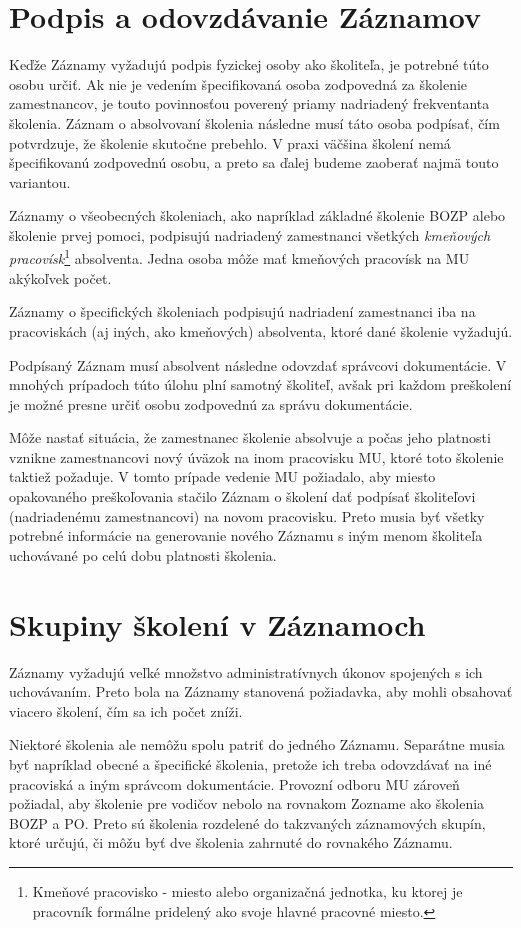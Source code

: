 \documentclass[
  digital,     %
  oneside,     %
  nosansbold,  %
  nocolorbold, %
  lof,         %
  nolot,         %
]{fithesis4}
\begin{document}
\section{Podpis a odovzdávanie Záznamov}
Keďže Záznamy vyžadujú podpis fyzickej osoby ako školiteľa, je potrebné túto osobu určiť. Ak nie je vedením špecifikovaná osoba zodpovedná za školenie zamestnancov, je touto povinnosťou poverený priamy nadriadený frekventanta školenia. Záznam o absolvovaní školenia následne musí táto osoba podpísať, čím potvrdzuje, že školenie skutočne prebehlo. V praxi väčšina školení nemá špecifikovanú zodpovednú osobu, a preto sa ďalej budeme zaoberať najmä touto variantou.

Záznamy o všeobecných školeniach, ako napríklad základné školenie BOZP alebo školenie prvej pomoci, podpisujú nadriadený zamestnanci všetkých \textit{kmeňových pracovísk}\footnote{Kmeňové pracovisko - miesto alebo organizačná jednotka, ku ktorej je pracovník formálne pridelený ako svoje hlavné pracovné miesto.} absolventa. Jedna osoba môže mať kmeňových pracovísk na MU akýkoľvek počet.

Záznamy o špecifických školeniach podpisujú nadriadení zamestnanci iba na pracoviskách (aj iných, ako kmeňových) absolventa, ktoré dané školenie vyžadujú.

Podpísaný Záznam musí absolvent následne odovzdať správcovi dokumentácie. V mnohých prípadoch túto úlohu plní samotný školiteľ, avšak pri každom preškolení je možné presne určiť osobu zodpovednú za správu dokumentácie.

Môže nastať situácia, že zamestnanec školenie absolvuje a počas jeho platnosti vznikne zamestnancovi nový úväzok na inom pracovisku MU, ktoré toto školenie taktiež požaduje. V tomto prípade vedenie MU požiadalo, aby miesto opakovaného preškoľovania stačilo Záznam o školení dať podpísať školiteľovi (nadriadenému zamestnancovi) na novom pracovisku. Preto musia byť všetky potrebné informácie na generovanie nového Záznamu s iným menom školiteľa uchovávané po celú dobu platnosti školenia.

\section{Skupiny školení v Záznamoch}
Záznamy vyžadujú veľké množstvo administratívnych úkonov spojených s ich uchovávaním. Preto bola na Záznamy stanovená požiadavka, aby mohli obsahovať viacero školení, čím sa ich počet zníži.

Niektoré školenia ale nemôžu spolu patriť do jedného Záznamu. Separátne musia byť napríklad obecné a špecifické školenia, pretože ich treba odovzdávať na iné pracoviská a iným správcom dokumentácie. Provozní odboru MU zároveň požiadal, aby školenie pre vodičov nebolo na rovnakom Zozname ako školenia BOZP a PO. Preto sú školenia rozdelené do takzvaných záznamových skupín, ktoré určujú, či môžu byť dve školenia zahrnuté do rovnakého Záznamu.
\end{document}
